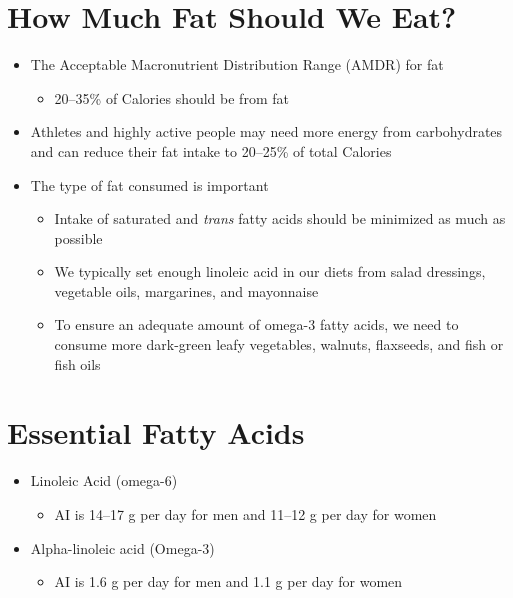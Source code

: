 \documentclass[title={Chapter 5}]{fdsn201notes}
\begin{document}
\section{How Much Fat Should We Eat?}\label{sec:how-much-fat-should-we-eat?}
\begin{itemize}
	\item The Acceptable Macronutrient Distribution Range (AMDR) for fat
	\begin{itemize}
		\item 20--35\% of Calories should be from fat
	\end{itemize}
	\item Athletes and highly active people may need more energy from carbohydrates and can reduce their fat intake to 20--25\% of total Calories
	\item The type of fat consumed is important
	\begin{itemize}
		\item Intake of saturated and \textit{trans} fatty acids should be minimized as much as possible
		\item We typically set enough linoleic acid in our diets from salad dressings, vegetable oils, margarines, and mayonnaise
		\item To ensure an adequate amount of omega-3 fatty acids, we need to consume more dark-green leafy vegetables, walnuts, flaxseeds, and fish or fish oils
	\end{itemize}
\end{itemize}

\section{Essential Fatty Acids}\label{sec:essential-fatty-acids-2}
\begin{itemize}
	\item Linoleic Acid (omega-6)
	\begin{itemize}
		\item AI is 14--17 g per day for men and 11--12 g per day for women
	\end{itemize}
	\item Alpha-linoleic acid (Omega-3)
	\begin{itemize}
		\item AI is 1.6 g per day for men and 1.1 g per day for women
	\end{itemize}
\end{itemize}
\end{document}
